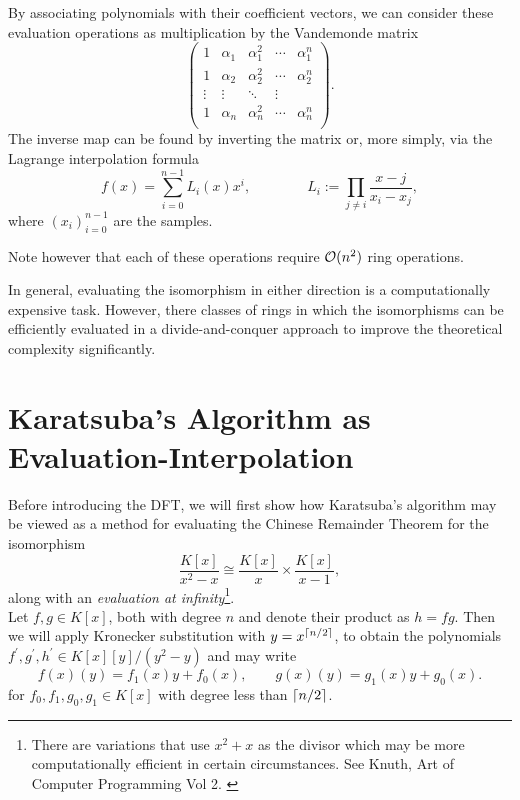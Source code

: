 By associating polynomials with their coefficient vectors, we can consider these evaluation operations as multiplication by the Vandemonde matrix
\[
  \begin{pmatrix}
      1 & \alpha_1 & \alpha_1^2 & \cdots & \alpha_1^n\\
      1 & \alpha_2 & \alpha_2^2 & \cdots & \alpha_2^n\\
      \vdots & \vdots & \ddots & \vdots\\
      1 & \alpha_n & \alpha_n^2 & \cdots & \alpha_n^n\\
  \end{pmatrix}.
\]
The inverse map can be found by inverting the matrix or, more simply, via the Lagrange interpolation formula
\[
    f(x) = \sum_{i=0}^{n-1} L_i(x)x^i, \qquad \qquad L_i := \prod_{j \neq i} \frac{x - j}{x_i - x_j},
\]
where $(x_i)_{i=0}^{n-1}$ are the samples.

Note however that each of these operations require $\mathcal O(n^2)$ ring operations.

In general, evaluating the isomorphism in either direction is a computationally expensive task. However, there classes of rings in which the isomorphisms can be efficiently evaluated in a divide-and-conquer approach to improve the theoretical complexity significantly.

\section{Karatsuba's Algorithm as Evaluation-Interpolation}%
\label{sec:Karatsuba's Algorithms as Evaluation-Interpolation}

Before introducing the DFT, we will first show how Karatsuba's algorithm may be viewed as a method for evaluating the Chinese Remainder Theorem for the isomorphism
\begin{equation}\label{eq:crt-karatsuba-iso}
    \frac{K[x]}{x^2 - x} \cong \frac{K[x]}{x} \times \frac{K[x]}{x-1},
\end{equation}
along with an \emph{evaluation at infinity}\footnote{There are variations that use $x^2 + x$ as the divisor which may be more computationally efficient in certain circumstances. See Knuth, Art of Computer Programming Vol 2. \cite{knuthv2}}.\\

Let $f, g \in K[x]$, both with degree $n$ and denote their product as $h = fg$. Then we will apply Kronecker substitution with $y = x^{\left \lceil n/2 \right \rceil}$, to obtain the polynomials $f^\prime, g^\prime, h^\prime \in K[x][y]/(y^2 - y)$ and may write
\[
    f(x)(y) = f_1(x)y + f_0(x), \qquad g(x)(y) = g_1(x)y + g_0(x).
\]
for $f_0, f_1, g_0, g_1 \in K[x]$ with degree less than $\left \lceil n/2 \right \rceil$.

